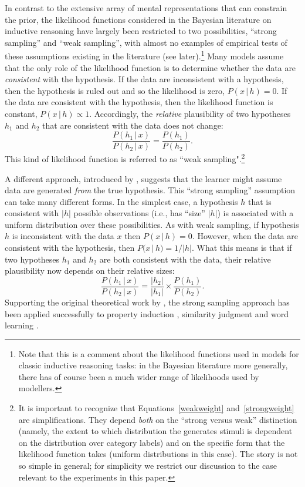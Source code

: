\documentclass[doc]{apa6}
\newcommand{\p}{P}
\newcommand{\condon}{\, | \,}
\begin{document}
In contrast to the extensive array of mental representations that can constrain the prior, the likelihood functions considered in the Bayesian literature on inductive reasoning have largely been restricted to two possibilities, ``strong sampling'' and ``weak sampling'', with almost no examples of empirical tests of these assumptions existing in the literature (see later).\footnote{Note that this is a comment about the likelihood functions used in models for classic inductive reasoning tasks: in the Bayesian literature more generally, there has of course been a much wider range of likelihoods used by modellers.} Many models \cite{Shepard1987,Heit1998,Kemp2009} assume that the only role of the likelihood function is to determine whether the data are {\it consistent} with the hypothesis. If the data are inconsistent with a hypothesis, then the hypothesis is ruled out and so the likelihood is zero, $\p(x\condon h)=0$. If the data are consistent with the hypothesis, then the likelihood function is constant, $\p(x\condon h) \propto 1$. Accordingly, the {\it relative} plausibility of two hypotheses $h_1$ and $h_2$ that are consistent with the data does not change:
\begin{equation}
\frac{\p(h_1\condon x)}{\p(h_2\condon x)} = \frac{\p(h_1)}{\p(h_2)}. \label{weakweight}
\end{equation}
This kind of likelihood function is referred to as ``weak sampling".\footnote{It is important to recognize that Equations~\ref{weakweight} and~\ref{strongweight} are simplifications. They depend {\it both} on the ``strong versus weak'' distinction (namely, the extent to which distribution the generates stimuli is dependent on the distribution over category labels) and on the specific form that the likelihood function takes (uniform distributions in this case). The story is not so simple in general; for simplicity we restrict our discussion to the case relevant to the experiments in this paper.}

A different approach, introduced by , suggests that the learner might assume data are generated {\it from} the true hypothesis. This ``strong sampling'' assumption can take many different forms. In the simplest case, a hypothesis $h$ that is consistent with $|h|$ possible observations (i.e., has ``size'' $|h|$) is associated with a uniform distribution over these possibilities. As with weak sampling, if hypothesis $h$ is inconsistent with the data $x$ then $\p(x\condon h)=0$. However, when the data are consistent with the hypothesis, then $\p(x\condon h) = 1/|h|$. What this means is that if two hypotheses $h_1$ and $h_2$ are both consistent with the data, their relative plausibility now depends on their relative sizes:
\begin{equation}
\frac{\p(h_1\condon x)}{\p(h_2\condon x)} = \frac{|h_2|}{|h_1|} \times \frac{\p(h_1)}{\p(h_2)}.  \label{strongweight}
\end{equation}
Supporting the original theoretical work by , the strong sampling approach has been applied successfully to property induction \cite{Sanjana2003}, similarity judgment \cite{Navarroinpress} and word learning \cite{Xu2007}.
\end{document}
